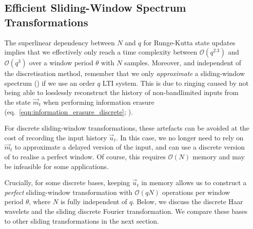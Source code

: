 %


\subsection{Efficient Sliding-Window Spectrum Transformations}
\label{sec:efficient_sliding_window}

The superlinear dependency between $N$ and $q$ for Runge-Kutta state updates implies that we effectively only reach a time complexity between $\mathcal{O}(q^{2.3})$ and $\mathcal{O}(q^3)$ over a window period $\theta$ with $N$ samples.
Moreover, and independent of the discretisation method, remember that we only \emph{approximate} a sliding-window spectrum () if we use an order $q$ LTI system.
This is due to ringing caused by not being able to losslessly reconstruct the history of non-bandlimited inputs from the state $\vec m_t$ when performing information erasure (eq.~\ref{eqn:information_erasure_discrete}; ).

For discrete sliding-window transformations, these artefacts can be avoided at the cost of recording the input history $\vec u_t$.
In this case, we no longer need to rely on $\vec m_t$ to approximate a delayed version of the input, and can use a discrete version of  to realise a perfect window.
Of course, this requires $\mathcal{O}(N)$ memory and may be infeasible for some applications.

Crucially, for some discrete bases, keeping $\vec u_t$ in memory allows us to construct a \emph{perfect} sliding-window transformation with $\mathcal{O}(qN)$ operations per window period $\theta$, where $N$ is fully independent of $q$.
Below, we discuss the discrete Haar wavelets and the sliding discrete Fourier transformation.
We compare these bases to other sliding transformations in the next section.

